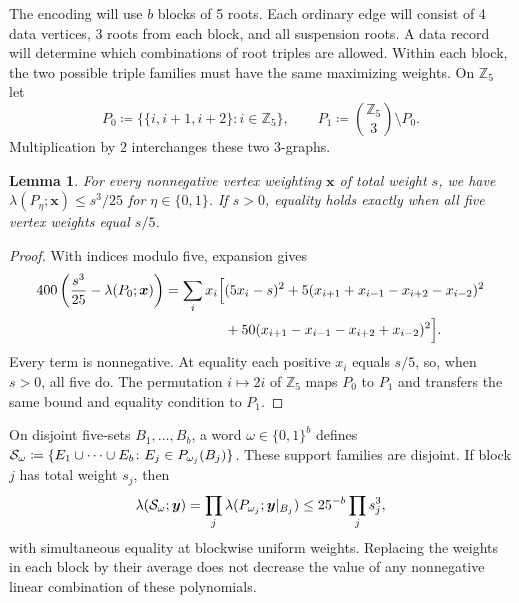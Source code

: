 \documentclass[10pt]{article}
\numberwithin{equation}{section}
\newtheorem{lemma}[lemma]{Lemma}\aliascntresetthe{lemma}
\theoremstyle{definition}
\newcommand{\x}{\boldsymbol{x}}\newcommand{\y}{\boldsymbol{y}}
\begin{document}
The encoding will use $b$ blocks of 5 roots. Each ordinary edge will consist of 4 data vertices, 3 roots from each block, and all suspension roots. A data record will determine which combinations of root triples are allowed. Within each block, the two possible triple families must have the same maximizing weights. On $\mathbb Z_5$ let
\[
 P_0\coloneqq\{\{i,i+1,i+2\}\colon i\in\mathbb Z_5\},\qquad
 P_1\coloneqq\binom{\mathbb Z_5}{3}\setminus P_0.
\]
Multiplication by $2$ interchanges these two $3$-graphs.
\begin{lemma}\label{lem:pentagon}
For every nonnegative vertex weighting $\x$ of total weight $s$, we have $\lambda(P_\eta;\x)\le s^3/25$ for $\eta\in\{0,1\}$. If $s>0$, equality holds exactly when all five vertex weights equal $s/5$.
\end{lemma}
\begin{proof}
With indices modulo five, expansion gives
\begin{equation}\label{eq:pentagonsquares}
 \begin{aligned}
 400\left(\frac{s^3}{25}-\lambda(P_0;\x)\right)
 =\sum_i x_i\Bigl[&(5x_i-s)^2
 +5(x_{i+1}+x_{i-1}-x_{i+2}-x_{i-2})^2\\
 &+50(x_{i+1}-x_{i-1}-x_{i+2}+x_{i-2})^2\Bigr].
 \end{aligned}
\end{equation}
Every term is nonnegative. At equality each positive $x_i$ equals $s/5$, so, when $s>0$, all five do. The permutation $i\mapsto2i$ of $\mathbb Z_5$ maps $P_0$ to $P_1$ and transfers the same bound and equality condition to $P_1$.
\end{proof}
On disjoint five-sets $B_1,\ldots,B_b$, a word $\omega\in\{0,1\}^b$ defines $\mathcal S_\omega\coloneqq\{E_1\cup\cdots\cup E_b\colon E_j\in P_{\omega_j}(B_j)\}$. These support families are disjoint. If block $j$ has total weight $s_j$, then
\begin{equation}\label{eq:binarybound}
 \lambda(\cS_\omega;\y)=\prod_j\lambda(P_{\omega_j};\y|_{B_j})
 \le25^{-b}\prod_j s_j^3,
\end{equation}
with simultaneous equality at blockwise uniform weights. Replacing the weights in each block by their average does not decrease the value of any nonnegative linear combination of these polynomials.
\end{document}
